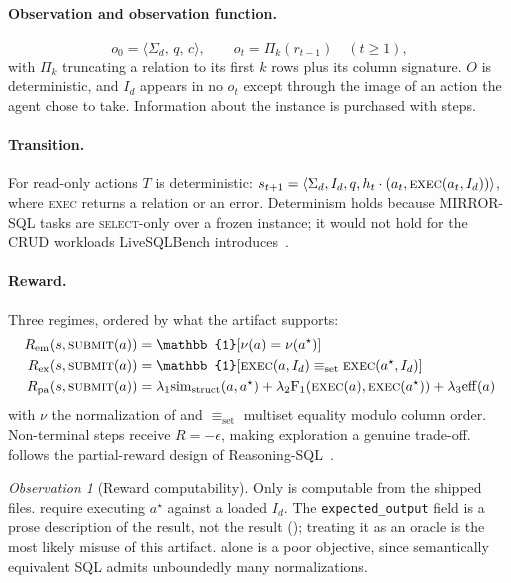 \documentclass[11pt,letterpaper]{article}
\theoremstyle{definition}
\theoremstyle{plain}
\theoremstyle{remark}
\newtheorem{observation}{Observation}
\newcommand{\code}[1]{\texttt{#1}}
\begin{document}
\paragraph{Observation and observation function.}
\[
  o_0 = \langle \Sigma_d,\, q,\, c \rangle, \qquad
  o_t = \Pi_k(r_{t-1}) \quad (t \ge 1),
\]
with $\Pi_k$ truncating a relation to its first $k$ rows plus its column signature. $O$ is
deterministic, and $I_d$ appears in no $o_t$ except through the image of an action the agent
chose to take. Information about the instance is purchased with steps.

\paragraph{Transition.}
For read-only actions $T$ is deterministic:
$s_{t+1} = \langle \Sigma_d, I_d, q, h_t \cdot (a_t, \textsc{exec}(a_t, I_d))\rangle$, where
\textsc{exec} returns a relation or an error. Determinism holds because MIRROR-SQL tasks are
\textsc{select}-only over a frozen instance; it would not hold for the CRUD workloads
LiveSQLBench introduces~\cite{livesqlbench2025}.

\paragraph{Reward.}
Three regimes, ordered by what the artifact supports:
\begin{align}
R_{\mathrm{em}}(s,\textsc{submit}(a)) &= \mathbb{1}\!\left[\nu(a) = \nu(a^\star)\right] \label{eq:em}\\
R_{\mathrm{ex}}(s,\textsc{submit}(a)) &= \mathbb{1}\!\left[\textsc{exec}(a, I_d) \equiv_{\text{set}} \textsc{exec}(a^\star, I_d)\right] \label{eq:ex}\\
R_{\mathrm{pa}}(s,\textsc{submit}(a)) &= \lambda_1 \mathrm{sim}_{\text{struct}}(a, a^\star) + \lambda_2 \mathrm{F}_1\!\left(\textsc{exec}(a), \textsc{exec}(a^\star)\right) + \lambda_3 \mathrm{eff}(a) \label{eq:pa}
\end{align}
with $\nu$ the normalization of  and $\equiv_{\text{set}}$ multiset equality
modulo column order. Non-terminal steps receive $R = -\epsilon$, making exploration a genuine
trade-off.  follows the partial-reward design of
Reasoning-SQL~\cite{pourreza2025reasoningsql}.

\begin{observation}[Reward computability]
\label{obs:reward}
Only  is computable from the shipped files.  require executing
$a^\star$ against a loaded $I_d$. The \code{expected\_output} field is a prose description of
the result, not the result (); treating it as an oracle is the most likely misuse
of this artifact.  alone is a poor objective, since semantically equivalent SQL
admits unboundedly many normalizations.
\end{observation}
\end{document}
